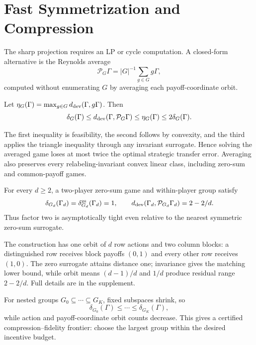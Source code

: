 \section{Fast Symmetrization and Compression}

The sharp projection requires an LP or cycle computation.  A closed-form alternative is the Reynolds average
\begin{equation}
\mathcal P_G\Gamma
=
|G|^{-1}\sum_{g\in G}g\Gamma,
\label{eq:reynolds}
\end{equation}
computed without enumerating $G$ by averaging each payoff-coordinate orbit.

\begin{theorem}
\label{thm:reynolds}
Let $\eta_G(\Gamma)=\max_{g\in G}d_{\mathrm{dev}}(\Gamma,g\Gamma)$.  Then
\begin{equation}
\delta_G(\Gamma)
\le
d_{\mathrm{dev}}(\Gamma,\mathcal P_G\Gamma)
\le
\eta_G(\Gamma)
\le
2\delta_G(\Gamma).
\label{eq:reynolds-chain}
\end{equation}
\end{theorem}
The first inequality is feasibility, the second follows by convexity, and the third applies the triangle inequality through any invariant surrogate.  Hence solving the averaged game loses at most twice the optimal strategic transfer error.  Averaging also preserves every relabeling-invariant convex linear class, including zero-sum and common-payoff games.

\begin{proposition}
\label{prop:reynolds-tight}
For every $d\ge2$, a two-player zero-sum game and within-player group satisfy
\[
\delta_{G_d}(\Gamma_d)
=
\delta_{G_d}^{\mathrm{zs}}(\Gamma_d)
=1,
\qquad
d_{\mathrm{dev}}(\Gamma_d,\mathcal P_{G_d}\Gamma_d)
=2-2/d.
\]
Thus factor two is asymptotically tight even relative to the nearest symmetric zero-sum surrogate.
\end{proposition}
The construction has one orbit of $d$ row actions and two column blocks: a distinguished row receives block payoffs $(0,1)$ and every other row receives $(1,0)$.  The zero surrogate attains distance one; invariance gives the matching lower bound, while orbit means $(d-1)/d$ and $1/d$ produce residual range $2-2/d$.  Full details are in the supplement.

For nested groups $G_0\subseteq\cdots\subseteq G_K$, fixed subspaces shrink, so
\begin{equation}
\delta_{G_0}(\Gamma)
\le\cdots\le
\delta_{G_K}(\Gamma),
\label{eq:defect-monotone}
\end{equation}
while action and payoff-coordinate orbit counts decrease.  This gives a certified compression--fidelity frontier: choose the largest group within the desired incentive budget.
